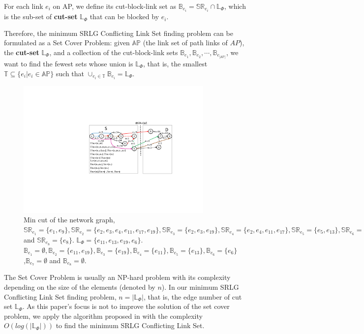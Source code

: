 For each link $e_i$ on AP, we define its cut-block-link set as ${\mathbb{B}_{{e_i}}} = \mathbb{SR}_{{e_i}} \cap \mathbb{L}_{\Phi}$, which is the sub-set of \textbf{cut-set} $\mathbb{L}_{\Phi}$ that can be blocked by $e_i$.

Therefore, the minimum SRLG Conflicting Link Set finding problem can be formulated as a Set Cover Problem: given $\mathbb{AP}$ (the link set of path links of $AP$), the \textbf{cut-set} $\mathbb{L}_{\Phi}$,  and a collection of the cut-block-link sets ${\mathbb{B}_{{e_1}}},{\mathbb{B}_{{e_2}}}, \cdots ,{\mathbb{B}_{{e_{|\mathbb{AP}|}}}}$, we want to find the fewest sets whose union is $\mathbb{L}_{\Phi}$, that is, the smallest $\mathbb{T} \subseteq \{e_i| e_i\in \mathbb{AP}\}$ such that ${ \cup_{e_i \in \mathbb{T}}}{\mathbb{B}_{e_i}} = \mathbb{L}_{\Phi}$.

\begin{figure}[tp]
  \centering
  \includegraphics[width=3.8in]{franz/MinCutStarGraph}
  \caption{Min cut of the network graph, $\mathbb{SR}_{e_1}=\{e_1, e_9\},\mathbb{SR}_{e_2}=\{e_2,e_3,e_4, e_{11},e_{17},e_{19}\},\mathbb{SR}_{e_3}=\{e_2,e_3, e_{19}\},\mathbb{SR}_{e_4}=\{e_2,e_4, e_{11},e_{17}\},\mathbb{SR}_{e_5}=\{e_5, e_{13}\},\mathbb{SR}_{e_6}=\{e_6\},\mathbb{SR}_{e_7}=\{e_7\} $ and $\mathbb{SR}_{e_8}=\{e_8\}$. $\mathbb{L}_{\Phi}=\{e_{11},e_{13},e_{19},e_{6}\}$. $\mathbb{B}_{e_1}=\emptyset,\mathbb{B}_{e_2}=\{e_{11},e_{19}\},\mathbb{B}_{e_3}=\{e_{19}\},\mathbb{B}_{e_4}=\{e_{11}\},\mathbb{B}_{e_5}=\{e_{13}\},\mathbb{B}_{e_6}=\{e_6\}$,$\mathbb{B}_{e_7}=\emptyset$ and $\mathbb{B}_{e_8}=\emptyset$.}\label{fig:MinCutStarGraph}
  \label{fig:MinCutStarGraph}
\end{figure}

The Set Cover Problem is usually an NP-hard problem with its complexity depending on the size of the elements (denoted by $n$). In our minimum SRLG Conflicting Link Set finding problem, $n=|\mathbb{L}_{\Phi}|$, that is, the edge number of cut set $\mathbb{L}_{\Phi}$. As this paper's focus is not to improve the solution of the set cover problem, we apply the algorithm proposed in \cite{chvatal1979greedy} with the complexity $O(log(|\mathbb{L}_{\Phi}|))$  to find the minimum SRLG Conflicting Link Set.

